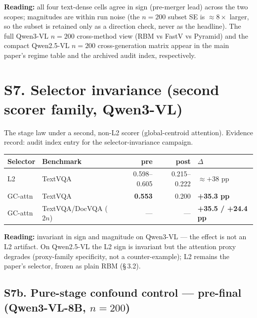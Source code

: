 \documentclass[journal]{IEEEtran}
\begin{document}
\noindent\textbf{Reading:} all four text-dense cells agree in sign (pre-merger
lead) across the two scopes; magnitudes are within run noise (the $n = 200$
subset SE is $\approx 8\times$ larger, so the subset is retained only as a
direction check, never as the headline). The full Qwen3-VL $n = 200$
cross-method view (RBM vs FastV vs Pyramid) and the compact Qwen2.5-VL
$n = 200$ cross-generation matrix appear in the main paper's regime table and
the archived audit index, respectively.

\section*{S7. Selector invariance (second scorer family, Qwen3-VL)}

The stage law under a second, non-L2 scorer (global-centroid attention).
Evidence record: audit index entry for the selector-invariance
campaign.

\begin{table}[ht]
  \centering
  \scriptsize
  \setlength{\tabcolsep}{2pt}
  \begin{tabular}{@{}l l r r l@{}}
    \toprule
    Selector & Benchmark & pre & post & $\Delta$ \\
    \midrule
    L2       & TextVQA              & 0.598--0.605 & 0.215--0.222 & $\approx +38$ pp \\
    GC-attn  & TextVQA              & \textbf{0.553} & 0.200 & \textbf{+35.3 pp} \\
    GC-attn  & TextVQA/DocVQA ($2n$)& --- & --- & \textbf{+35.5 / +24.4 pp} \\
    \bottomrule
  \end{tabular}
\end{table}

\noindent\textbf{Reading:} invariant in sign and magnitude on Qwen3-VL --- the
effect is not an L2 artifact. On Qwen2.5-VL the L2 sign is invariant but the
attention proxy degrades (proxy-family specificity, not a counter-example); L2
remains the paper's selector, frozen as plain RBM (\S\,3.2).

\subsection*{S7b. Pure-stage confound control --- pre-final (Qwen3-VL-8B, $n = 200$)}
\end{document}
